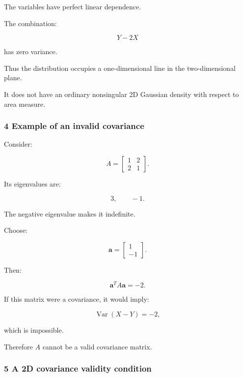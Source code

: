 The variables have perfect linear dependence.

The combination:

\[
 Y-2X
\]

has zero variance.

Thus the distribution occupies a one-dimensional line in the two-dimensional plane.

It does not have an ordinary nonsingular 2D Gaussian density with respect to area measure.

\begin{allmightroleexample}

\subsubsection{4 Example of an invalid covariance}\label{02-foundations-ii-ch024-example-of-an-invalid-covariance}

\hypertarget{02-foundations-ii-ch024-example-of-an-invalid-covariance}{}

Consider:

\end{allmightroleexample}

\[
 \boxed{ A= \begin{bmatrix} 1&2\\ 2&1 \end{bmatrix} }.
\]

Its eigenvalues are:

\[
 3,\qquad-1.
\]

The negative eigenvalue makes it indefinite.

Choose:

\[
 \mathbf a= \begin{bmatrix} 1\\-1 \end{bmatrix}.
\]

Then:

\[
 \mathbf a^TA\mathbf a=-2.
\]

If this matrix were a covariance, it would imply:

\[
 \operatorname{Var}(X-Y)=-2,
\]

which is impossible.

Therefore \(A\) cannot be a valid covariance matrix.

\subsubsection{5 A 2D covariance validity condition}\label{02-foundations-ii-ch024-a-2d-covariance-validity-condition}

